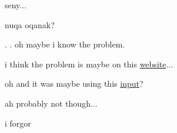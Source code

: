 \noindent
seny...

nuqa oqanak?

\newpage
\vspace{90 cm}
.
\newpage
\vspace{90 cm}
.
\newpage
\vspace{90 cm}
oh maybe i know the problem.


\newpage
\vspace{90 cm}
i think
\newpage
\vspace{90 cm}
the problem is maybe on this \href{https://pofinal24.kattis.com/contests/pofinal24}{website}...


\newpage
\vspace{90 cm}
oh and it was maybe using this \href{https://github.com/hairez/random-files/blob/main/cool-numbers-001.txt}{input}? 



\newpage
\vspace{90 cm}
ah probably not though...


\newpage
\vspace{90 cm}
i forgor
